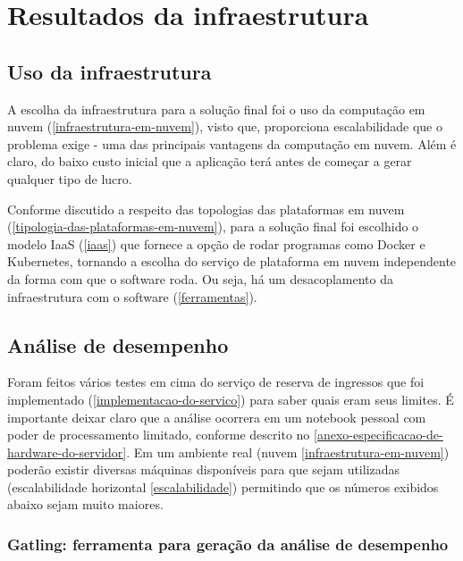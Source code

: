 \chapter{Resultados da infraestrutura}

\section{Uso da infraestrutura}

A escolha da infraestrutura para a solução final foi o uso da
computação em nuvem (\autoref{infraestrutura-em-nuvem}), visto que, proporciona
escalabilidade que o problema exige - uma das principais vantagens da computação em nuvem.
Além é claro, do baixo custo inicial que a aplicação terá antes de começar a gerar qualquer
tipo de lucro.

Conforme discutido a respeito das topologias das plataformas em
nuvem (\autoref{tipologia-das-plataformas-em-nuvem}), para a solução final foi escolhido o
modelo IaaS (\autoref{iaas}) que fornece a opção de rodar programas como Docker e
Kubernetes, tornando a escolha do serviço de plataforma em nuvem independente da forma
com que o software roda. Ou seja, há um desacoplamento da infraestrutura com o software
(\autoref{ferramentas}).

\section{Análise de desempenho}

Foram feitos vários testes em cima do serviço de reserva de ingressos que foi implementado
(\autoref{implementacao-do-servico}) para saber quais eram seus limites.
É importante deixar claro que a análise ocorrera em um notebook pessoal com poder
de processamento limitado, conforme descrito no
\autoref{anexo-especificacao-de-hardware-do-servidor}.
Em um ambiente real (nuvem \autoref{infraestrutura-em-nuvem})
poderão existir diversas máquinas disponíveis para que sejam utilizadas
(escalabilidade horizontal \autoref{escalabilidade})
permitindo que os números exibidos abaixo sejam muito maiores.

\subsection{Gatling: ferramenta para geração da análise de desempenho}

